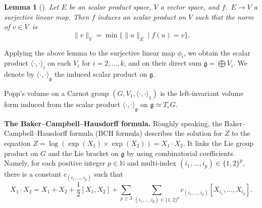 \documentclass[10pt,a4paper]{amsart}
\numberwithin{equation}{section}
\newtheorem{Lemma}[Theorem]{Lemma}
\newcommand{\g}{\mathfrak{g}}
\newcommand{\N}{\mathbb{N}}
\begin{document}
\begin{Lemma}[{\cite[Lemma~20.3]{agr}}]
 Let $E$ be an scalar product space,
 $V$ a vector space,
 and $f{:}$ $E\to V$ a surjective linear map.
 Then $f$ induces an scalar product on $V$ such that the norm of $v\in V$~is
 \[
 \|v\|_{V}=\min\{\|u\|_E\mid f(u)=v\}.
 \]
\end{Lemma}

Applying the above lemma to the surjective linear map $\phi_i$,
we obtain the scalar product $\langle\cdot,\cdot\rangle_i$ on each $V_i$ for $i=2,\dots,k$,
and on their direct sum $\g=\bigoplus V_i$.
We denote by $\langle\cdot,\cdot\rangle_{\g}$ the induced scalar product on $\g$.
\begin{Definition}\label{defpopp}
 Popp's volume on a Carnot group $(G,V_1,\langle\cdot,\cdot\rangle_1)$ is the left-invariant volume form induced from the scalar product $\langle\cdot,\cdot\rangle_{\g}$ on $\g\simeq T_eG$.
\end{Definition}

{\bf The Baker--Campbell--Hausdorff formula.}
Roughly speaking,
the Baker--Campbell--Haus\-dorff formula (BCH formula) describes the solution for $Z$ to the equation $Z=\log(\exp(X_1)\times\exp(X_2))=X_1\cdot X_2$.
It links the Lie group product on $G$ and the Lie bracket on $\g$ by using combinatorial coefficients.
Namely,
for each positive integer $p\in\N$ and multi-index $(i_1,\dots,i_p)\in\{1,2\}^p$,
there is a constant $c_{(i_1,\dots,i_p)}$ such that
\[
X_1\cdot X_2=X_1+X_2+\frac{1}{2}[X_1,X_2]+\sum_{p\geq 3}\sum_{(i_1,\dots,i_p)\in \{1,2\}^p}c_{(i_1,\dots,i_p)}[X_{i_1},\dots,X_{i_p}].
\]
\end{document}
